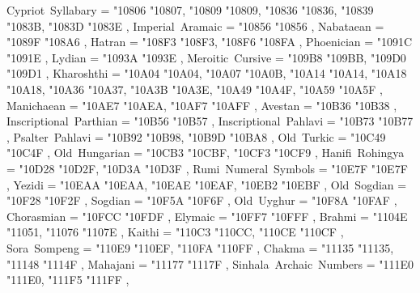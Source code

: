 {    Cypriot~Syllabary                              = { {"10806} {"10807}, {"10809} {"10809}, {"10836} {"10836}, {"10839} {"1083B}, {"1083D} {"1083E} },
    Imperial~Aramaic                               = { {"10856} {"10856} },
    Nabataean                                      = { {"1089F} {"108A6} },
    Hatran                                         = { {"108F3} {"108F3}, {"108F6} {"108FA} },
    Phoenician                                     = { {"1091C} {"1091E} },
    Lydian                                         = { {"1093A} {"1093E} },
    Meroitic~Cursive                               = { {"109B8} {"109BB}, {"109D0} {"109D1} },
    Kharoshthi                                     = { {"10A04} {"10A04}, {"10A07} {"10A0B}, {"10A14} {"10A14}, {"10A18} {"10A18}, {"10A36} {"10A37}, {"10A3B} {"10A3E}, {"10A49} {"10A4F}, {"10A59} {"10A5F} },
    Manichaean                                     = { {"10AE7} {"10AEA}, {"10AF7} {"10AFF} },
    Avestan                                        = { {"10B36} {"10B38} },
    Inscriptional~Parthian                         = { {"10B56} {"10B57} },
    Inscriptional~Pahlavi                          = { {"10B73} {"10B77} },
    Psalter~Pahlavi                                = { {"10B92} {"10B98}, {"10B9D} {"10BA8} },
    Old~Turkic                                     = { {"10C49} {"10C4F} },
    Old~Hungarian                                  = { {"10CB3} {"10CBF}, {"10CF3} {"10CF9} },
    Hanifi~Rohingya                                = { {"10D28} {"10D2F}, {"10D3A} {"10D3F} },
    Rumi~Numeral~Symbols                           = { {"10E7F} {"10E7F} },
    Yezidi                                         = { {"10EAA} {"10EAA}, {"10EAE} {"10EAF}, {"10EB2} {"10EBF} },
    Old~Sogdian                                    = { {"10F28} {"10F2F} },
    Sogdian                                        = { {"10F5A} {"10F6F} },
    Old~Uyghur                                     = { {"10F8A} {"10FAF} },
    Chorasmian                                     = { {"10FCC} {"10FDF} },
    Elymaic                                        = { {"10FF7} {"10FFF} },
    Brahmi                                         = { {"1104E} {"11051}, {"11076} {"1107E} },
    Kaithi                                         = { {"110C3} {"110CC}, {"110CE} {"110CF} },
    Sora~Sompeng                                   = { {"110E9} {"110EF}, {"110FA} {"110FF} },
    Chakma                                         = { {"11135} {"11135}, {"11148} {"1114F} },
    Mahajani                                       = { {"11177} {"1117F} },
    Sinhala~Archaic~Numbers                        = { {"111E0} {"111E0}, {"111F5} {"111FF} },
}
